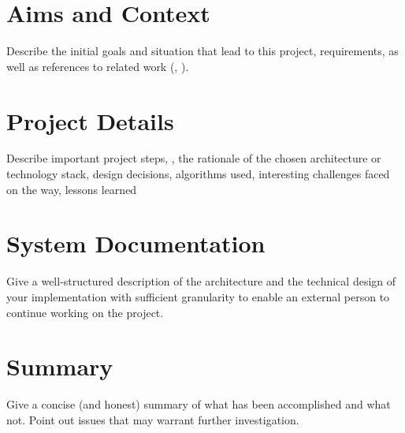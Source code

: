 \documentclass[language=english,titlepage=false,smartquotes=true]{hgbreport}
\begin{document}
\tableofcontents

\chapter{Aims and Context}

Describe the initial goals and situation that lead to this project,
requirements, as well as references to related work (\eg, \cite{Higham2020}).

\chapter{Project Details}

Describe important project steps, \eg, the rationale of the chosen architecture
or technology stack, design decisions, algorithms used, interesting challenges
faced on the way, lessons learned \etc

\chapter{System Documentation}

Give a well-structured description of the architecture and the technical design
of your implementation with sufficient granularity to enable an external person
to continue working on the project.

\chapter{Summary}

Give a concise (and honest) summary of what has been accomplished and what not. 
Point out issues that may warrant further investigation.
\end{document}
